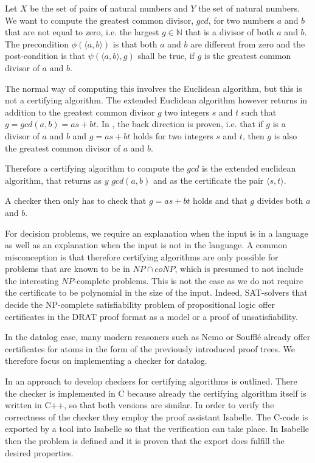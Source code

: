 \begin{example}
    Let $X$ be the set of pairs of natural numbers and $Y$ the set of natural numbers. We want to compute the greatest common divisor, $gcd$, for two numbers $a$ and $b$ that are not equal to zero, i.e. the largest $g \in \mathbb{N}$ that is a divisor of both $a$ and $b$. The precondition $\phi(\langle a, b\rangle)$ is that both $a$ and $b$ are different from zero and the post-condition is that $\psi(\langle a, b\rangle, g)$ shall be true, if $g$ is the greatest common divisor of $a$ and $b$.

    The normal way of computing this involves the Euclidean algorithm, but this is not a certifying algorithm. The extended Euclidean algorithm however returns in addition to the greatest common divisor $g$ two integers $s$ and $t$ such that $g = gcd(a,b) = a s + b t$. In \cite{CertAlg}, the back direction is proven, i.e. that if $g$ is a divisor of $a$ and $b$ and $g = a s + b  t$ holds for two integers $s$ and $t$, then $g$ is also the greatest common divisor of $a$ and $b$.

    Therefore a certifying algorithm to compute the $gcd$ is the extended euclidean algorithm, that returns as $y$ $gcd(a,b)$ and as the certificate the pair $\langle s, t\rangle$.

    A checker then only has to check that $g=a s + b t$ holds and that $g$ divides both $a$ and $b$. 
\end{example}

For decision problems, we require an explanation when the input is in a language as well as an explanation when the input is not in the language. A common misconception is that therefore certifying algorithms are only possible for problems that are known to be in $NP \cap coNP$, which is presumed to not include the interesting $NP$-complete problems. This is not the case as we do not require the certificate to be polynomial in the size of the input. Indeed, SAT-solvers that decide the NP-complete satisfiability problem of propositional logic offer certificates in the DRAT proof format as a model or a proof of unsatisfiability\cite{DRAT}.

In the datalog case, many modern reasoners such as Nemo or Soufflé already offer certificates for atoms in the form of the previously introduced proof trees. We therefore focus on implementing a checker for datalog.

In \cite{CertCheckerWorkflow} an approach to develop checkers for certifying algorithms is outlined. There the checker is implemented in C because already the certifying algorithm itself is written in C++, so that both versions are similar. In order to verify the correctness of the checker they employ the proof assistant Isabelle. The C-code is exported by a tool into Isabelle so that the verification can take place. In Isabelle then the problem is defined and it is proven that the export does fulfill the desired properties. 

